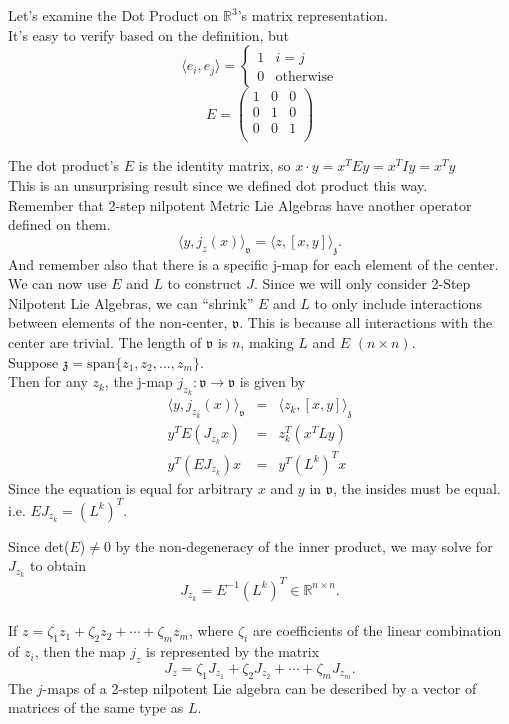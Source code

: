 \documentclass[11 pt]{article}
\newcommand{\br}[2]{\left[#1,#2\right]}
\newcommand{\inp}[2]{\langle #1, #2 \rangle}
\newcommand{\R}{\mathbb{R}}
\newcommand{\fz}{\mathfrak{z}}
\newcommand{\fv}{\mathfrak{v}}
\newcommand{\RR}{\mathbb{R}}
\begin{document}
    \begin{example}
        Let's examine the Dot Product on $\RR^3$'s matrix representation.
        \\It's easy to verify based on the definition, but
        $$
        \inp{e_i}{e_j}
        = \begin{cases}
            1 & i = j \\
            0 & \text{otherwise}
        \end{cases}
        $$
        $$
        E = \begin{pmatrix}
            1 & 0 & 0\\
            0 & 1 & 0\\
            0 & 0 & 1\\
        \end{pmatrix}
        $$
    \end{example}
    The dot product's $E$ is the identity matrix, so
    $x \cdot y = x^{T}Ey = x^{T}Iy = x^{T}y$
    \\This is an unsurprising result since we defined dot product this way.
    \\Remember that 2-step nilpotent Metric Lie Algebras have another operator
    defined on them.
    $$
    \inp{y}{j_z(x)}_\fv = \inp{z}{\br{x}{y}}_\fz.
    $$
    And remember also that there is a specific j-map for each element of the
    center.  We can now use $E$ and $L$ to construct $J$.
    Since we will only consider 2-Step Nilpotent Lie Algebras, we can
    ``shrink'' $E$ and $L$ to only include interactions between elements of
    the non-center, $\fv$.  This is because all interactions with the center
    are trivial. The length of $\fv$ is $n$, making $L$ and $E$ $(n \times n)$.
    \smallskip
    \\Suppose $\fz = \text{span} \{ z_1,z_2,\hdots,z_m \}$.
    \\Then for any $z_k$, the j-map $j_{z_k}: \fv \to \fv$ is given by
    \begin{eqnarray*}
        \inp{y}{j_{z_k}(x)}_\fv	& = & \inp{z_k}{\br{x}{y}}_\fz \\
        y^T E (J_{z_k}x)		& = & z_k^T (x^TLy)\\
        y^T (E J_{z_k}) x		& = & y^T(L^k)^T x
    \end{eqnarray*}
    Since the equation is equal for arbitrary $x$ and $y$ in $\fv$,
    the insides must be equal.  i.e. $EJ_{z_k} = (L^k)^T$.

    Since det($E$)$\neq 0$ by the non-degeneracy of the inner product, we may
    solve for $J_{z_k}$ to obtain
    \\
    $$
    J_{z_k} = E^{-1}(L^k)^T \in \R^{n \times n}.
    $$
    \\
    If $z = \zeta_1z_1 + \zeta_2z_2 + \cdots + \zeta_mz_m$, where $\zeta_i$
    are coefficients of the linear combination of $z_i$, then the map $j_z$
    is represented by the matrix
    \\
    $$
    J_z = \zeta_1J_{z_1} + \zeta_2J_{z_2} + \cdots + \zeta_mJ_{z_m}.
    $$
    The $j$-maps of a 2-step nilpotent Lie algebra can be described by a vector of matrices of the same type as $L$.
    \\
\end{document}
